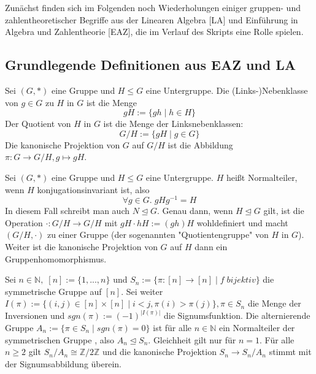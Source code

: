 \documentclass[../main.tex]{subfiles}
\begin{document}
Zunächst finden sich im Folgenden noch Wiederholungen einiger gruppen- und zahlentheoretischer Begriffe aus der Linearen Algebra [LA] und Einführung in Algebra und Zahlentheorie [EAZ], die im Verlauf des Skripts eine Rolle spielen.

\subsection{Grundlegende Definitionen aus EAZ und LA}

\begin{definition}[Radikal]
\TODO
\end{definition}
\begin{definition}
    Sei $(G, *)$ eine Gruppe und $H \leq G$ eine Untergruppe. Die (Links-)Nebenklasse von $g \in G$ zu $H$ in $G$ ist die Menge $$gH := \{gh \mid h \in H\}$$
    Der Quotient von $H$ in $G$ ist die Menge der Linksnebenklassen:
    $$G/H := \{gH \mid g \in G\}$$
    Die kanonische Projektion von $G$ auf $G/H$ ist die Abbildung $\pi: G \rightarrow G/H, g \mapsto gH$.
\end{definition}
\begin{definition}
Sei $(G, *)$ eine Gruppe und $H \leq G$ eine Untergruppe. $H$ heißt Normalteiler, wenn $H$ konjugationsinvariant ist, also
$$\forall g \in G. \; gHg^{-1} = H$$
In diesem Fall schreibt man auch $N \trianglelefteq G$.
Genau dann, wenn $H \trianglelefteq G$ gilt, ist die Operation $\cdot: G/H \rightarrow G/H$ mit $gH \cdot hH := (gh)H$ wohldefiniert und macht $(G/H, \cdot)$ zu einer Gruppe (der sogenannten "Quotientengruppe" von $H$ in $G$). Weiter ist die kanonische Projektion von $G$ auf $H$ dann ein Gruppenhomomorphismus.
\end{definition}
\begin{example}
Sei $n \in \mathbb{N}, \; [n] := \{1,...,n\}$ und $S_n := \{\pi: [n] \rightarrow [n] \mid f \; bijektiv\}$ die symmetrische Gruppe auf $[n]$. Sei weiter $I(\pi) := \{(i,j) \in [n] \times [n] \mid i < j, \pi(i) > \pi(j)\}, \pi \in S_n$ die Menge der Inversionen und $sgn(\pi) := (-1)^{|I(\pi)|}$ die Signumsfunktion. Die alternierende Gruppe $A_n := \{\pi \in S_n \mid sgn(\pi) = 0\}$ ist für alle $n \in \mathbb{N}$ ein Normalteiler der symmetrischen Gruppe , also $A_n \trianglelefteq S_n$. Gleichheit gilt nur für $n = 1$.
Für alle $n \geq 2$  gilt $S_n/A_n \cong \mathbb{Z}/2\mathbb{Z}$ und die kanonische Projektion $S_n \rightarrow S_n/A_n$ stimmt mit der Signumsabbildung überein.
\end{example}
\end{document}
